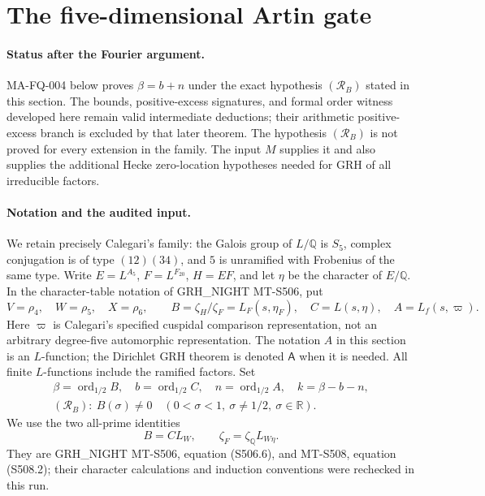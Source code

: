 \section{The five-dimensional Artin gate}
\label{sec:ma-s5}

\paragraph{Status after the Fourier argument.}
MA-FQ-004 below proves $\beta=b+n$ under the exact hypothesis
$(\mathcal R_B)$ stated in this section. The bounds, positive-excess
signatures, and formal order witness developed here remain valid
intermediate deductions; their arithmetic positive-excess branch
is excluded by that later theorem. The hypothesis
$(\mathcal R_B)$ is not proved for every extension in the family.
The input $M$ supplies it and also supplies the additional Hecke
zero-location hypotheses needed for GRH of all irreducible factors.

\paragraph{Notation and the audited input.}
We retain precisely Calegari's family: the Galois group of $L/\mathbb Q$
is $S_5$, complex conjugation is of type $(12)(34)$, and $5$ is
unramified with Frobenius of the same type. Write
$E=L^{A_5}$, $F=L^{F_{20}}$, $H=EF$, and let $\eta$ be the character
of $E/\mathbb Q$. In the character-table notation of
GRH\_NIGHT MT-S506, put
\[
 V=\rho_4,\quad W=\rho_5,\quad X=\rho_6,\qquad
 B=\zeta_H/\zeta_F=L_F(s,\eta_F),\quad C=L(s,\eta),
 \quad A=L_f(s,\varpi).
\]
Here $\varpi$ is Calegari's specified cuspidal comparison representation,
not an arbitrary degree-five automorphic representation. The notation
$A$ in this section is an $L$-function; the Dirichlet GRH theorem is
denoted $\mathsf A$ when it is needed. All finite $L$-functions include
the ramified factors. Set
\[
 \begin{gathered}
 \beta=\operatorname{ord}_{1/2} B,\quad b=\operatorname{ord}_{1/2} C,
 \quad n=\operatorname{ord}_{1/2} A,\quad
 k=\beta-b-n,\\
 (\mathcal R_B):\ B(\sigma)\ne0\quad
 (0<\sigma<1,\ \sigma\ne1/2,\ \sigma\in\mathbb R).
 \end{gathered}
\]
We use the two all-prime identities
\[
 B=C L_W,\qquad \zeta_F=\zeta_{\mathbb Q}L_{W\eta}.
 \tag{MA-S5.1}
\]
They are GRH\_NIGHT MT-S506, equation (S506.6), and MT-S508,
equation (S508.2); their character calculations and induction conventions
were rechecked in this run.

